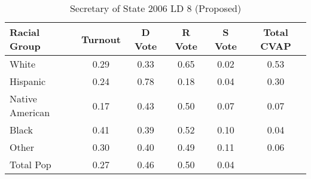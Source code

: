 \begin{table}[htb]
\begin{center}
\caption{Secretary of State 2006 LD 8 (Proposed)}
\label{sos06_cvap_ld_8}
\begin{tabular}{lccccc}
  \hline
Racial Group & Turnout & D Vote & R Vote & S Vote & Total CVAP \\ 
  \hline
White & 0.29 & 0.33 & 0.65 & 0.02 & 0.53 \\ 
  Hispanic & 0.24 & 0.78 & 0.18 & 0.04 & 0.30 \\ 
  Native American & 0.17 & 0.43 & 0.50 & 0.07 & 0.07 \\ 
  Black & 0.41 & 0.39 & 0.52 & 0.10 & 0.04 \\ 
  Other & 0.30 & 0.40 & 0.49 & 0.11 & 0.06 \\ 
  Total Pop & 0.27 & 0.46 & 0.50 & 0.04 &  \\ 
   \hline
\end{tabular}
\end{center}
\end{table}

